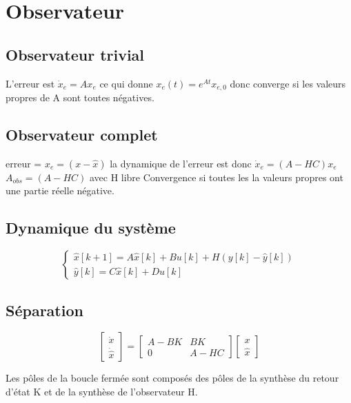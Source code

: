 \documentclass[resume]{subfiles}
\begin{document}
\section{Observateur}

\subsection{Observateur trivial}
L'erreur est $\dot{x}_e=Ax_e$ ce qui donne $x_e(t)=e^{At}x_{e,0}$ donc converge si les valeurs propres de A sont toutes négatives.

\subsection{Observateur complet}

erreur = $x_e = (x - \hat{x})$ la dynamique de l'erreur est donc $\dot{x}_e = (A-HC)x_e$ 
$A_{obs} = (A-HC)$ avec H libre
Convergence si toutes les la valeurs propres ont une partie réelle négative.

\subsection{Dynamique du système}
$$
\begin{cases}
\hat{x}[k+1] = A\hat{x}[k]+Bu[k]+H(y[k]-\hat{y}[k])\\
\hat{y}[k] = C\hat{x}[k]+Du[k]
\end{cases}
$$

\subsection{Séparation }
$$
\begin{bmatrix}
\dot{x}\\
\dot{\hat{x}}
\end{bmatrix} = 
\begin{bmatrix}
A-BK & BK\\
0 & A-HC
\end{bmatrix}
\begin{bmatrix}
x\\
\hat{x}
\end{bmatrix}
$$

Les pôles de la boucle fermée sont composés des pôles de la synthèse du retour d'état K et de la synthèse de l'observateur H.
\end{document}
